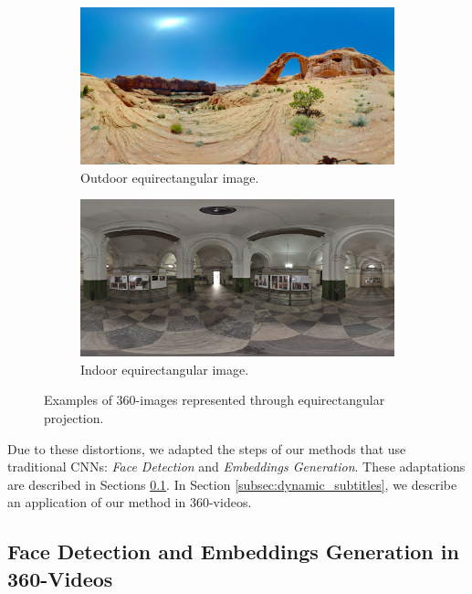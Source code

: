 \begin{figure}[!ht]
\centering
    \begin{subfigure}{0.47\linewidth}
        \centering
        \includegraphics[width=1\textwidth]{img/image (9).jpg}
        \caption{Outdoor equirectangular image.}
        \label{subfig:out_equi}
    \end{subfigure}\hfill
    \begin{subfigure}{0.47\linewidth}
        \centering
        \includegraphics[width=1\textwidth]{img/image (10).JPG}
        \caption{Indoor equirectangular image.}
        \label{subfig:in_equi}
    \end{subfigure}

\caption{Examples of 360-images represented through equirectangular projection.}
\label{fig:equirectangular_proj}
\end{figure}

Due to these distortions, we adapted the steps of our methods that use traditional CNNs: \emph{Face Detection} and \emph{Embeddings Generation}. These adaptations are described in Sections \ref{subsec:360_adaptations}. In Section \ref{subsec:dynamic_subtitles}, we describe an application of our method in 360-videos.

\subsection{Face Detection and Embeddings Generation in 360-Videos}
\label{subsec:360_adaptations}

